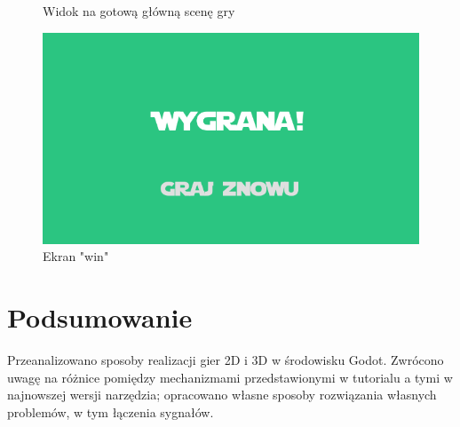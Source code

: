 \documentclass[a4paper]{article}
\begin{document}
\begin{sloppypar}
\begin{center}
\begin{figure}[htb]
			\caption{Widok na gotową główną scenę gry}
		\end{figure}
		\begin{figure}[htb]
			\centering
			\includegraphics[width=1\textwidth]{3d/win_screen.png}
			\caption{Ekran "win"}
		\end{figure}
	\end{center}
	\clearpage
	\section[htb]{Podsumowanie}
	Przeanalizowano sposoby realizacji gier 2D i 3D w środowisku Godot. Zwrócono uwagę na różnice pomiędzy
	mechanizmami przedstawionymi w tutorialu a tymi w najnowszej wersji narzędzia; opracowano własne sposoby
	rozwiązania własnych problemów, w tym łączenia sygnałów.
\end{sloppypar}
\end{document}
